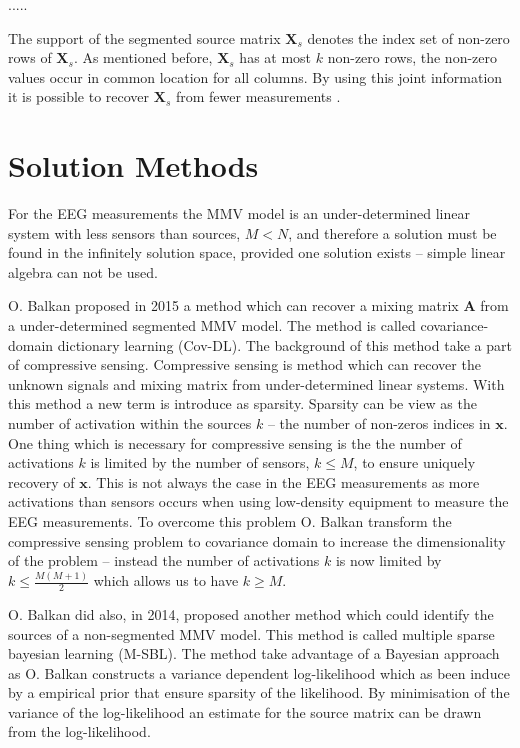 .....

The support of the segmented source matrix $\mathbf{X}_s$ denotes the index set of non-zero rows of $\mathbf{X}_s$. 
As mentioned before, $\mathbf{X}_s$ has at most $k$ non-zero rows, the non-zero values occur in common location for all columns. 
By using this joint information it is possible to recover $\mathbf{X}_s$ from fewer measurements \cite[p. 43]{CS}.

\section{Solution Methods}\label{sec:sol_met}
For the EEG measurements the MMV model is an under-determined linear system with less sensors than sources, $M < N$, and therefore a solution must be found in the infinitely solution space, provided one solution exists -- simple linear algebra can not be used.

O. Balkan \cite{Balkan2015} proposed in 2015 a method which can recover a mixing matrix $\mathbf{A}$ from a under-determined segmented MMV model. 
The method is called covariance-domain dictionary learning (Cov-DL).
The background of this method take a part of compressive sensing. 
Compressive sensing is method which can recover the unknown signals and mixing matrix from under-determined linear systems. 
With this method a new term is introduce as sparsity. Sparsity can be view as the number of activation within the sources $k$ -- the number of non-zeros indices in $\mathbf{x}$.
One thing which is necessary for compressive sensing is the the number of activations $k$ is limited by the number of sensors, $k \leq M$, to ensure uniquely recovery of $\mathbf{x}$.
This is not always the case in the EEG measurements as more activations than sensors occurs when using low-density equipment to measure the EEG measurements.
To overcome this problem O. Balkan transform the compressive sensing problem to covariance domain to increase the dimensionality of the problem -- instead the number of activations $k$ is now limited by $k \leq \frac{M(M+1)}{2}$ which allows us to have $k \geq M$.

O. Balkan \cite{Balkan2014} did also, in 2014, proposed another method which could identify the sources of a non-segmented MMV model. 
This method is called multiple sparse bayesian learning (M-SBL).
The method take advantage of a Bayesian approach as O. Balkan constructs a variance dependent log-likelihood which as been induce by a empirical prior that ensure sparsity of the likelihood. 
By minimisation of the variance of the log-likelihood an estimate for the source matrix can be drawn from the log-likelihood.


